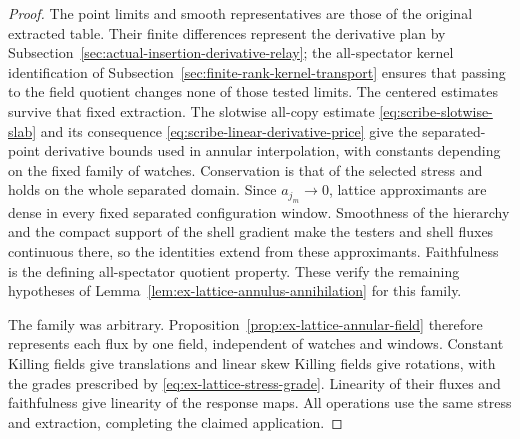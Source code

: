 \begin{proof}
The point limits and smooth representatives are those of the original
extracted table. Their finite differences represent the derivative plan
by Subsection~\ref{sec:actual-insertion-derivative-relay}; the all-spectator
kernel identification of Subsection~\ref{sec:finite-rank-kernel-transport}
ensures that passing to the field quotient changes none of those tested
limits. The centered estimates survive that fixed extraction. The
slotwise all-copy estimate \eqref{eq:scribe-slotwise-slab} and its
consequence \eqref{eq:scribe-linear-derivative-price} give the
separated-point derivative bounds used in annular interpolation, with
constants depending on the fixed family of watches. Conservation is
that of the selected stress and holds on the whole separated domain.
Since $a_{j_m}\to0$, lattice approximants are dense in every fixed
separated configuration window. Smoothness of the hierarchy and the
compact support of the shell gradient make the testers and shell fluxes
continuous there, so the identities extend from these approximants.
Faithfulness is the defining all-spectator quotient property.
These verify the remaining hypotheses of
Lemma~\ref{lem:ex-lattice-annulus-annihilation} for this family.

The family was arbitrary. Proposition~\ref{prop:ex-lattice-annular-field}
therefore represents each flux by one field, independent of watches
and windows. Constant Killing fields give translations and linear skew
Killing fields give rotations, with the grades prescribed by
\eqref{eq:ex-lattice-stress-grade}. Linearity of their fluxes and
faithfulness give linearity of the response maps. All operations use the
same stress and extraction, completing the claimed application.
\end{proof}

